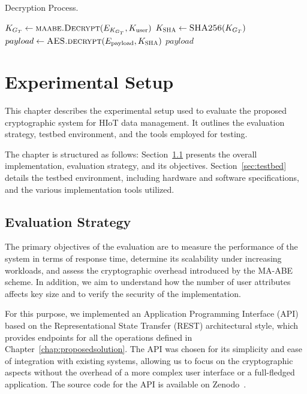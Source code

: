 \documentclass[cic,tc,english]{iiufrgs}
\numberwithin{algorithm}{chapter}
\begin{document}
        \begin{algorithm}[h]
            \caption{Decryption Process.}
            \label{alg:decryption_process}
            \begin{algorithmic}[1]
                \State $K_{G_T} \gets \textsc{maabe.Decrypt}(E_{K_{G_T}}, K_{\text{user}})$
                \State $K_{\textsc{SHA}} \gets \textsc{SHA256}(K_{G_T})$
                \State $payload \gets \textsc{AES.decrypt}(E_{\text{payload}}, K_{\textsc{SHA}})$
                \State \Return $payload$
            \EndProcedure
            \end{algorithmic}
        \end{algorithm}

    
\chapter{Experimental Setup}
\label{chap:experimentalsetup}

    This chapter describes the experimental setup used to evaluate the proposed cryptographic system for HIoT data management. It outlines the evaluation strategy, testbed environment, and the tools employed for testing.

    The chapter is structured as follows: Section~\ref{sec:evaluation-strategy} presents the overall implementation, evaluation strategy, and its objectives. Section~\ref{sec:testbed} details the testbed environment, including hardware and software specifications, and the various implementation tools utilized.

    \section{Evaluation Strategy}
        \label{sec:evaluation-strategy}
        The primary objectives of the evaluation are to measure the performance of the system in terms of response time, determine its scalability under increasing workloads, and assess the cryptographic overhead introduced by the MA-ABE scheme. In addition, we aim to understand how the number of user attributes affects key size and to verify the security of the implementation.

        For this purpose, we implemented an Application Programming Interface (API) based on the Representational State Transfer (REST) architectural style, which provides endpoints for all the operations defined in Chapter~\ref{chap:proposedsolution}. The API was chosen for its simplicity and ease of integration with existing systems, allowing us to focus on the cryptographic aspects without the overhead of a more complex user interface or a full-fledged application. The source code for the API is available on Zenodo~\citep{maabeflask}.
\end{document}
